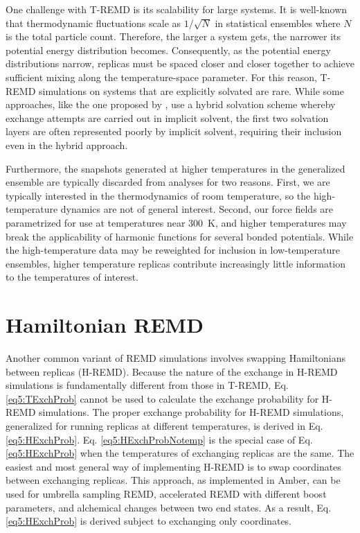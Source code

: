 One challenge with T-REMD is its scalability for large systems. It is well-known
that thermodynamic fluctuations scale as $1/\sqrt{N}$ in statistical ensembles
where $N$ is the total particle count. Therefore, the larger a system gets, the
narrower its potential energy distribution becomes. Consequently, as the
potential energy distributions narrow, replicas must be spaced closer and closer
together to achieve sufficient mixing along the temperature-space parameter. For
this reason, T-REMD simulations on systems that are explicitly solvated are
rare. While some approaches, like the one proposed by \citeauthor{Okur2006}, use
a hybrid solvation scheme whereby exchange attempts are carried out in implicit
solvent, the first two solvation layers are often represented poorly by implicit
solvent, requiring their inclusion even in the hybrid approach. \cite{Okur2006}

Furthermore, the snapshots generated at higher temperatures in the generalized
ensemble are typically discarded from analyses for two reasons. First, we are
typically interested in the thermodynamics of room temperature, so the
high-temperature dynamics are not of general interest. Second, our force fields
are parametrized for use at temperatures near \mbox{300 K}, and higher
temperatures may break the applicability of harmonic functions for several
bonded potentials. While the high-temperature data may be reweighted for
inclusion in low-temperature ensembles,
\cite{Chodera_JChemTheoryComput_2007_v3_p26} higher temperature replicas
contribute increasingly little information to the temperatures of interest.

\section{Hamiltonian REMD}

Another common variant of REMD simulations involves swapping Hamiltonians
between replicas (H-REMD). Because the nature of the exchange in H-REMD
simulations is fundamentally different from those in T-REMD, Eq.
\ref{eq5:TExchProb} cannot be used to calculate the exchange probability for
H-REMD simulations. The proper exchange probability for H-REMD simulations,
generalized for running replicas at different temperatures, is derived in Eq.
\ref{eq5:HExchProb}. Eq. \ref{eq5:HExchProbNotemp} is the special case of Eq.
\ref{eq5:HExchProb} when the temperatures of exchanging replicas are the same.
The easiest and most general way of implementing H-REMD is to swap coordinates
between exchanging replicas. This approach, as implemented in Amber, can be used
for umbrella sampling REMD, \cite{Babin_JChemPhys_2008_v128_p134101,
Sugita_JChemPhys_2000_v113_p6042} accelerated REMD with different boost
parameters, \cite{Fajer_JComputChem_2009_v30_p1719,
Arrar_JChemTheoryComput_2013_v9_p18} and alchemical changes between two end
states. \cite{Meng_JChemTheoryComput_2011_v7_p2721} As a result, Eq.
\ref{eq5:HExchProb} is derived subject to exchanging only coordinates.

